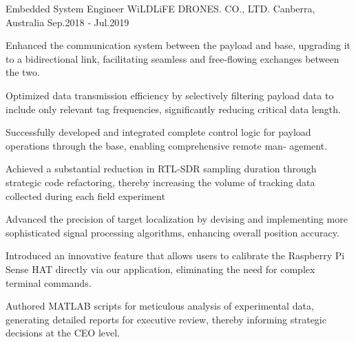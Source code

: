 \begin{cventries}
  \cventry
    {Embedded System Engineer} %
    {WiLDLiFE DRONES. CO., LTD. } %
    {Canberra, Australia} %
    {Sep.2018 ‑ Jul.2019} %
    {
      \begin{cvitems} %
        \item {Enhanced the communication system between the payload and base, upgrading it to a bidirectional link, facilitating seamless and free‑flowing
        exchanges between the two.}
        \item {Optimized data transmission efficiency by selectively filtering payload data to include only relevant tag frequencies, significantly reducing critical
        data length.}
        \item {Successfully developed and integrated complete control logic for payload operations through the base, enabling comprehensive remote man‑
        agement.}
        \item {Achieved a substantial reduction in RTL‑SDR sampling duration through strategic code refactoring, thereby increasing the volume of tracking
        data collected during each field experiment}
        \item {Advanced the precision of target localization by devising and implementing more sophisticated signal processing algorithms, enhancing overall
        position accuracy.}
        \item {Introduced an innovative feature that allows users to calibrate the Raspberry Pi Sense HAT directly via our application, eliminating the need for
        complex terminal commands.}
        \item {Authored MATLAB scripts for meticulous analysis of experimental data, generating detailed reports for executive review, thereby informing
        strategic decisions at the CEO level.}
      \end{cvitems}
    }

\end{cventries}
